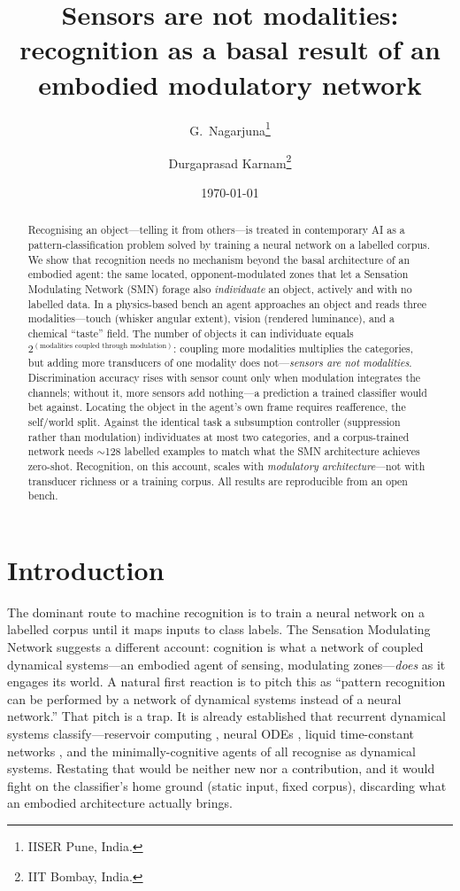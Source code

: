 \documentclass[11pt]{article}
\title{\textbf{Sensors are not modalities:\\ recognition as a basal result of an embodied modulatory network}}
\author{G.\ Nagarjuna\thanks{IISER Pune, India.} \and Durgaprasad Karnam\thanks{IIT Bombay, India.}}
\date{\today}
\begin{document}
\maketitle

\begin{abstract}
\noindent
Recognising an object---telling it from others---is treated in contemporary AI
as a pattern-classification problem solved by training a neural network on a
labelled corpus. We show that recognition needs no mechanism beyond the basal
architecture of an embodied agent: the same located, opponent-modulated zones
that let a Sensation Modulating Network (SMN) forage also \emph{individuate} an
object, actively and with no labelled data. In a physics-based bench an agent
approaches an object and reads three modalities---touch (whisker angular
extent), vision (rendered luminance), and a chemical ``taste'' field. The number
of objects it can individuate equals $2^{(\text{modalities coupled through
modulation})}$: coupling more modalities multiplies the categories, but adding
more transducers of one modality does not---\emph{sensors are not modalities}.
Discrimination accuracy rises with sensor count only when modulation integrates
the channels; without it, more sensors add nothing---a prediction a trained
classifier would bet against. Locating the object in the agent's own frame
requires reafference, the self/world split. Against the identical task a
subsumption controller (suppression rather than modulation) individuates at most
two categories, and a corpus-trained network needs $\sim$128 labelled examples
to match what the SMN architecture achieves zero-shot. Recognition, on this
account, scales with \emph{modulatory architecture}---not with transducer
richness or a training corpus. All results are reproducible from an open bench.
\end{abstract}

\section{Introduction}

The dominant route to machine recognition is to train a neural network on a
labelled corpus until it maps inputs to class labels. The Sensation Modulating
Network \citep{NagarjunaKarnam2026SMN} suggests a different account: cognition is
what a network of coupled dynamical systems---an embodied agent of sensing,
modulating zones---\emph{does} as it engages its world. A natural first reaction
is to pitch this as ``pattern recognition can be performed by a network of
dynamical systems instead of a neural network.'' That pitch is a trap. It is
already established that recurrent dynamical systems classify---reservoir
computing \citep{Maass2002,JaegerHaas2004}, neural ODEs
\citep{Chen2018NeuralODE}, liquid time-constant networks \citep{Hasani2021Liquid},
and the minimally-cognitive agents of \citet{Beer2003} all recognise as
dynamical systems. Restating that would be neither new nor a contribution, and
it would fight on the classifier's home ground (static input, fixed corpus),
discarding what an embodied architecture actually brings.
\end{document}
